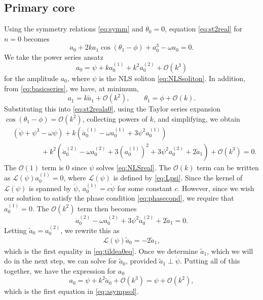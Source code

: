 \documentclass[11pt,reqno]{amsart}
\def\calL{{\mathcal L}}
\begin{document}
\subsection{Primary core}

Using the symmetry relations \cref{eq:symm} and $\theta_0 = 0$, equation \cref{eq:st2real} for $n=0$ becomes
\begin{equation}\label{eq:st2reala0}
\ddot a_0  + 2 k a_1 \cos(\theta_1 - \phi) + a_0^3 - \omega a_0 = 0.
\end{equation}
We take the power series ansatz 
\[
a_0 = \psi + k a_0^{(1)} + k^2 a_0^{(2)} + \mathcal{O}(k^3)
\]
for the amplitude $a_0$, where $\psi$ is the NLS soliton \cref{eq:NLSsoliton}. In addition, from \cref{eq:basicseries}, we have, at minimum, 
\[
a_1 = k \widetilde{a}_1 + \mathcal{O}(k^2), \qquad \theta_1 = \phi + \mathcal{O}(k).
\]
Substituting this into \cref{eq:st2reala0}, using the Taylor series expansion $\cos(\theta_1-\phi) = \mathcal{O}(k^2)$, collecting powers of $k$, and simplifying, we obtain
\begin{equation*}
\begin{aligned}
&\left(\ddot{\psi} + \psi^3 - \omega \psi\right) 
+ k\left(\ddot a_0^{(1)} - \omega a_0^{(1)} + 3 \psi^2 a_0^{(1)}\right) \\
&\qquad\qquad+ k^2\left(\ddot a_0^{(2)} - \omega a_0^{(2)} + 3\left(a_0^{(1)}\right)^2 + 3 \psi^2 a_0^{(2)} + 2 \widetilde{a}_1 \right) + \mathcal{O}(k^3) = 0.
\end{aligned}
\end{equation*}
The $\mathcal{O}(1)$ term is 0 since $\psi$ solves \cref{eq:NLSreal}. The $\mathcal{O}(k)$ term can be written as $\calL(\psi)a_0^{(1)}=0$, where $\calL(\psi)$ is defined by \cref{eq:Lpsi}. Since the kernel of $\calL(\psi)$ is spanned by $\dot \psi$, $a_0^{(1)} = c \dot \psi$ for some constant $c$. However, since we wish our solution to satisfy the phase condition \cref{eq:phasecond}, we require that $a_0^{(1)} = 0$. The $\mathcal{O}(k^2)$ term then becomes
\[
\ddot a_0^{(2)} - \omega a_0^{(2)} + 3 \psi^2 a_0^{(2)} + 2 \widetilde{a}_1 = 0.
\]
Letting $\widetilde{a}_0 = a_0^{(2)}$, we rewrite this as
\begin{align}\label{eq:solvea0ta}
\calL(\psi) \widetilde{a}_0 = -2 \widetilde{a}_1,
\end{align}
which is the first equality in \cref{eq:tildea0eq}. Once we determine $\widetilde{a}_1$, which we will do in the next step, we can solve for $\widetilde{a}_0$, provided $\widetilde{a}_1 \perp \dot\psi$. Putting all of this together, we have the expression for $a_0$
\begin{equation}\label{eq:a0eq}
a_0 = \psi + k^2 \widetilde{a}_0 + \mathcal{O}(k^3) = \psi + \mathcal{O}(k^2),
\end{equation}
which is the first equation in \cref{eq:asympsol}.
\end{document}
